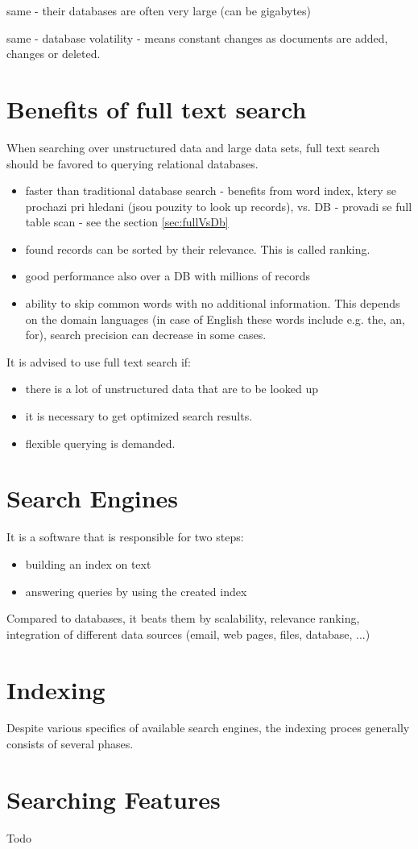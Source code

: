 same - their databases are often very large (can be gigabytes)

same - database volatility - means constant changes as documents are
added, changes or deleted.


\section{Benefits of full text search}

When searching over unstructured data and large data sets, full text
search should be favored to querying relational databases.
\begin{itemize}
\item faster than traditional database search - benefits from word index,
ktery se prochazi pri hledani (jsou pouzity to look up records),
vs. DB - provadi se full table scan - see the section \ref{sec:fullVsDb}
\item found records can be sorted by their relevance. This is called ranking.
\item good performance also over a DB with millions of records
\item ability to skip common words with no additional information. This
depends on the domain languages (in case of English these words include
e.g. the, an, for), search precision can decrease in some cases. 
\end{itemize}
It is advised to use full text search if:
\begin{itemize}
	\item there is a lot of unstructured data that are to be looked up
	\item it is necessary to get optimized search results.
	\item flexible querying is demanded.
\end{itemize}

\section{Search Engines}

It is a software that is responsible for two steps:
\begin{itemize}
\item building an index on text
\item answering queries by using the created index
\end{itemize}
Compared to databases, it beats them by scalability, relevance ranking,
integration of different data sources (email, web pages, files, database,
...)


\section{Indexing}

Despite various specifics of available search engines, the indexing proces generally consists of several phases.
\cite{Fox:1991:FFA:903195}


\section{Searching Features}

Todo
